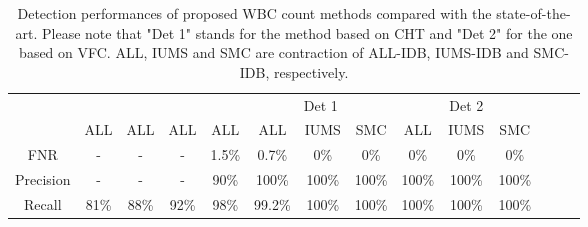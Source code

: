 \documentclass[final,a4paper,12pt,english]{UnicaPhdThesis3}
\begin{document}
\begin{table}[t]
	\centering\tabcolsep=0.2mm
	\begin{tabular}{c cccc ccc ccc ccc}
		\hline
		& \small \cite{Mahmood}	&	\small \cite{Alilou}  	&	\small \cite{Put14b}	&	\small \cite{Alomari}	&	\multicolumn{3}{c}{Det 1} & \multicolumn{3}{c}{Det 2}\\
		&  \small ALL   &  \small ALL  & 	\small ALL  & 	\small ALL  &  \small ALL  &	\small IUMS & \small SMC &  \small ALL  &	\small IUMS & \small SMC \\
		\hline
		FNR			& 	- 	& 	- 	&	-	&	1.5\% 	&	0.7\% 	& 	0\%  & 0\% & 0\% & 0\% & 0\% \\
		Precision 	&	-	& 	- &	- &	90\% &	100\%  & 100\% 	& 	100\% & 100\% & 100\% & 100\% \\
		Recall		& 	81\%  &  88\% & 92\% & 	98\% &	99.2\% 	& 	100\%  & 100\% & 100\% & 100\% & 100\% \\
		\hline
	\end{tabular} 
	\label{resulttab}
	\caption{Detection performances of proposed WBC count methods compared with the state-of-the-art. Please note that "Det 1" stands for the method based on CHT and "Det 2" for the one based on VFC. ALL, IUMS and SMC are contraction of ALL-IDB, IUMS-IDB and SMC-IDB, respectively.}
\end{table}
\end{document}

